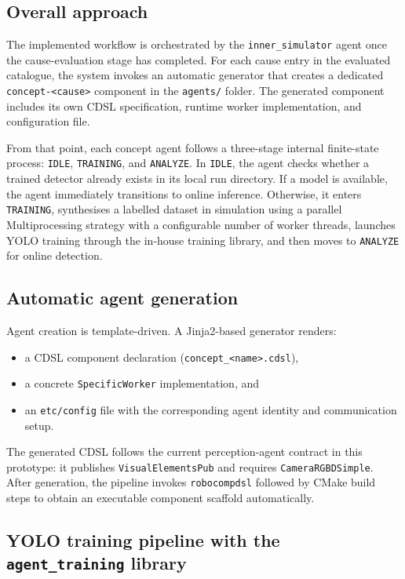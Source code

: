 \documentclass[a4paper, twoside]{article}
\begin{document}
\subsection{Overall approach}

The implemented workflow is orchestrated by the \texttt{inner\_simulator} agent once the cause-evaluation stage has completed.
For each cause entry in the evaluated catalogue, the system invokes an automatic generator that creates a dedicated \texttt{concept-<cause>} component in the \texttt{agents/} folder.
The generated component includes its own CDSL specification, runtime worker implementation, and configuration file.

From that point, each concept agent follows a three-stage internal finite-state process:
\texttt{IDLE}, \texttt{TRAINING}, and \texttt{ANALYZE}.
In \texttt{IDLE}, the agent checks whether a trained detector already exists in its local run directory.
If a model is available, the agent immediately transitions to online inference.
Otherwise, it enters \texttt{TRAINING}, synthesises a labelled dataset in simulation using a parallel Multiprocessing strategy with a configurable number of worker threads, launches YOLO training through the in-house training library, and then moves to \texttt{ANALYZE} for online detection.

\subsection{Automatic agent generation}

Agent creation is template-driven.
A Jinja2-based generator renders:
\begin{itemize}
    \item a CDSL component declaration (\texttt{concept\_<name>.cdsl}),
    \item a concrete \texttt{SpecificWorker} implementation, and
    \item an \texttt{etc/config} file with the corresponding agent identity and communication setup.
\end{itemize}

The generated CDSL follows the current perception-agent contract in this prototype: it publishes \texttt{VisualElementsPub} and requires \texttt{CameraRGBDSimple}.
After generation, the pipeline invokes \texttt{robocompdsl} followed by CMake build steps to obtain an executable component scaffold automatically.

\subsection{YOLO training pipeline with the \texttt{agent\_training} library}
\end{document}
